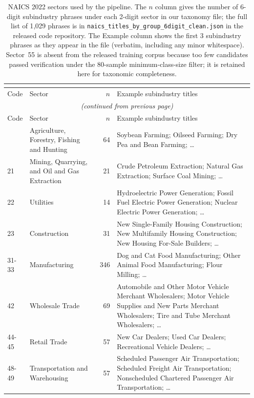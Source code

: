 \begin{longtable}{@{}lp{4.3cm}rp{6.0cm}@{}}
\caption{NAICS 2022 sectors used by the pipeline. The $n$ column gives the number of 6-digit subindustry phrases under each 2-digit sector in our taxonomy file; the full list of 1{,}029 phrases is in \texttt{naics\_titles\_by\_group\_6digit\_clean.json} in the released code repository. The Example column shows the first 3 subindustry phrases as they appear in the file (verbatim, including any minor whitespace). Sector~55 is absent from the released training corpus because too few candidates passed verification under the 80-sample minimum-class-size filter; it is retained here for taxonomic completeness.}\\
\label{tab:naics-appendix}\\
\toprule
Code & Sector & $n$ & Example subindustry titles \\
\midrule
\endfirsthead
\multicolumn{4}{c}{\textit{(continued from previous page)}}\\
\toprule
Code & Sector & $n$ & Example subindustry titles \\
\midrule
\endhead
\bottomrule
\endlastfoot
11 & Agriculture, Forestry, Fishing and Hunting & 64 & Soybean Farming; Oilseed Farming; Dry Pea and Bean Farming; \dots \\
21 & Mining, Quarrying, and Oil and Gas Extraction & 21 & Crude Petroleum Extraction; Natural Gas Extraction; Surface Coal Mining; \dots \\
22 & Utilities & 14 & Hydroelectric Power Generation; Fossil Fuel Electric Power Generation; Nuclear Electric Power Generation; \dots \\
23 & Construction & 31 & New Single-Family Housing Construction; New Multifamily Housing Construction; New Housing For-Sale Builders; \dots \\
31-33 & Manufacturing & 346 & Dog and Cat Food Manufacturing; Other Animal Food Manufacturing; Flour Milling; \dots \\
42 & Wholesale Trade & 69 & Automobile and Other Motor Vehicle Merchant Wholesalers; Motor Vehicle Supplies and New Parts Merchant Wholesalers; Tire and Tube Merchant Wholesalers; \dots \\
44-45 & Retail Trade & 57 & New Car Dealers; Used Car Dealers; Recreational Vehicle Dealers; \dots \\
48-49 & Transportation and Warehousing & 57 & Scheduled Passenger Air Transportation; Scheduled Freight Air Transportation; Nonscheduled Chartered Passenger Air Transportation; \dots \\

\end{longtable}
